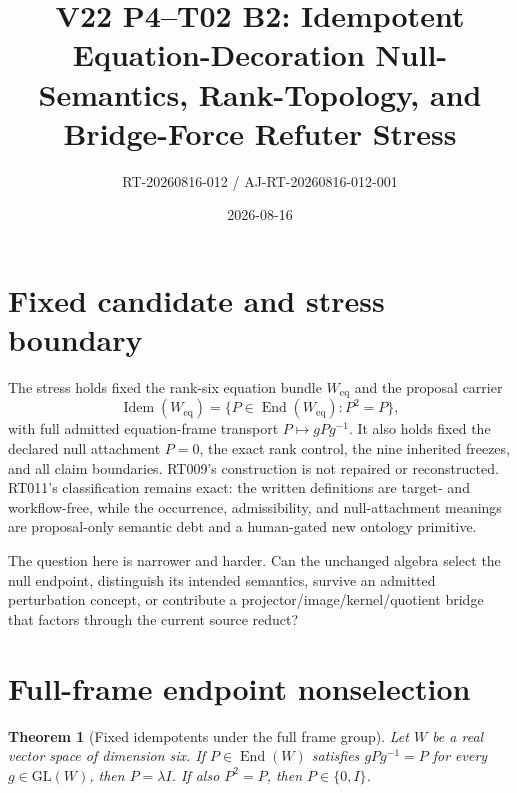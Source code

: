 \documentclass[11pt]{article}
\title{V22 P4--T02 B2: Idempotent Equation-Decoration Null-Semantics, Rank-Topology, and Bridge-Force Refuter Stress}
\author{RT-20260816-012 / AJ-RT-20260816-012-001}
\date{2026-08-16}
\newtheorem{theorem}{Theorem}
\newcommand{\Weq}{W_{\mathrm{eq}}}
\newcommand{\Idem}{\operatorname{Idem}}
\begin{document}
\maketitle

\begin{center}
\end{center}

\section{Fixed candidate and stress boundary}

The stress holds fixed the rank-six equation bundle $\Weq$ and the proposal
carrier
\[
  \Idem(\Weq)=\{P\in\operatorname{End}(\Weq):P^2=P\},
\]
with full admitted equation-frame transport $P\mapsto gPg^{-1}$.  It also
holds fixed the declared null attachment $P=0$, the exact rank control, the
nine inherited freezes, and all claim boundaries.  RT009's construction is
not repaired or reconstructed.  RT011's classification remains exact: the
written definitions are target- and workflow-free, while the occurrence,
admissibility, and null-attachment meanings are proposal-only semantic debt
and a human-gated new ontology primitive.

The question here is narrower and harder.  Can the unchanged algebra select
the null endpoint, distinguish its intended semantics, survive an admitted
perturbation concept, or contribute a projector/image/kernel/quotient bridge
that factors through the current source reduct?

\section{Full-frame endpoint nonselection}

\begin{theorem}[Fixed idempotents under the full frame group]
Let $W$ be a real vector space of dimension six.  If $P\in\operatorname{End}(W)$
satisfies $gPg^{-1}=P$ for every $g\in\mathrm{GL}(W)$, then $P=\lambda I$.
If also $P^2=P$, then $P\in\{0,I\}$.
\end{theorem}
\end{document}

